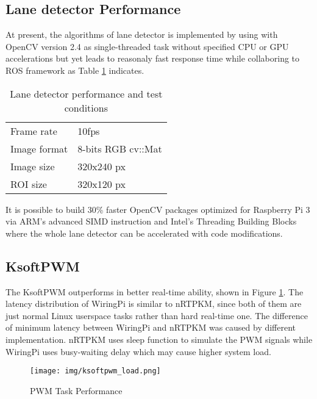\begin{spacing}{2.0}
\subsection{Lane detector Performance}

At present, the algorithms of lane detector is implemented by using with OpenCV version 2.4 as single-threaded task without specified CPU or GPU accelerations but yet leads to reasonaly fast response time while collaboring to ROS framework as Table \ref{lane_detector_condition} indicates.

\begin{table}[!htbp]
	\centering
	\caption{Lane detector performance and test conditions}
	\label{lane_detector_condition}
	\begin{tabular}{ll}
		Frame rate                      &10fps \\
		Image format                    &8-bits RGB cv::Mat \\
		Image size                      &320x240 px	 \\	
		ROI size                        &320x120 px
	\end{tabular}
\end{table}

It is possible to build 30\% faster OpenCV packages \cite{faster-opencv} optimized for Raspberry Pi 3 via ARM's advanced SIMD instruction \cite{arm-neon} and Intel's Threading Building Blocks \cite{intel-tbb} where the whole lane detector can be accelerated with code modifications.

\subsection{KsoftPWM}

The KsoftPWM outperforms in better real-time ability, shown in Figure \ref{fig:ksoftpwm_perf}. The latency distribution of WiringPi is similar to nRTPKM, since both of them are just normal Linux userspace tasks rather than hard real-time one. The difference of minimum latency between WiringPi and nRTPKM was caused by different implementation. nRTPKM uses sleep function to simulate the PWM signals while WiringPi uses busy-waiting delay which may cause higher system load.

\begin{figure}
	\centering
	\texttt{[image: img/ksoftpwm\_load.png]}
	\caption{PWM Task Performance}
	\label{fig:ksoftpwm_perf}
\end{figure}

\end{spacing}
\clearpage
{}

